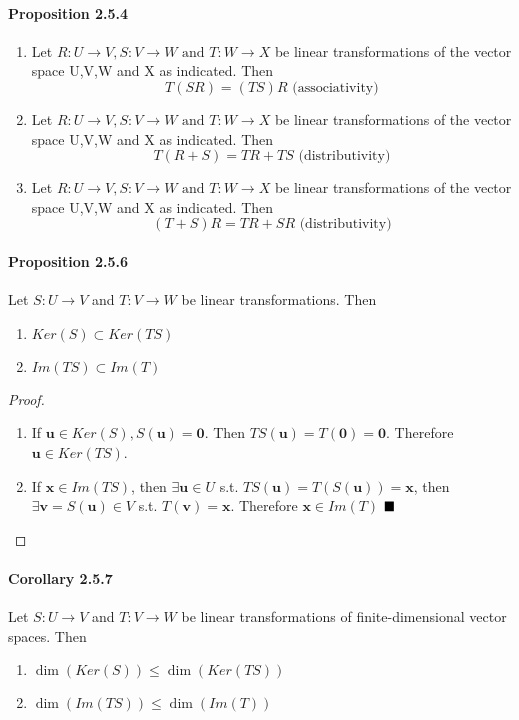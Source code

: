 \documentclass[11pt]{article}
\newcommand{\tb}[1]{\textbf{#1}}
\newcommand{\qed}[0]{$\hfill\blacksquare$}
\newcommand{\vx}[0]{\tb{x}}
\newcommand{\vo}[0]{\tb{0}}
\newcommand{\vu}[0]{\tb{u}}
\newcommand{\trans}[3]{{#1}: {#2} \rightarrow {#3}}
\begin{document}
{\paragraph{Proposition 2.5.4}
\begin{enumerate}
	\item Let $\trans{R}{U}{V}, \trans{S}{V}{W} \mbox{ and } \trans{T}{W}{X}$ be linear transformations of the vector space U,V,W and X as indicated. Then
	$$T(SR) = (TS)R \mbox{ (associativity)}$$
	\item Let $\trans{R}{U}{V}, \trans{S}{V}{W} \mbox{ and } \trans{T}{W}{X}$ be linear transformations of the vector space U,V,W and X as indicated. Then
	$$T(R+S) = TR + TS \mbox{ (distributivity)}$$
	\item Let $\trans{R}{U}{V}, \trans{S}{V}{W} \mbox{ and } \trans{T}{W}{X}$ be linear transformations of the vector space U,V,W and X as indicated. Then
	$$(T+S)R = TR + SR \mbox{ (distributivity)}$$
\end{enumerate}
\paragraph{Proposition 2.5.6} Let $\trans{S}{U}{V}$ and $\trans{T}{V}{W}$ be linear transformations. Then
\begin{enumerate}
	\item $Ker(S) \subset Ker(TS)$
	\item $Im(TS) \subset Im(T)$
\end{enumerate}
\begin{proof}
	\begin{enumerate}
		\item If $\vu \in Ker(S), S(\vu) = \vo$. Then $TS(\vu) = T(\vo) = \vo$. Therefore $\vu \in Ker(TS)$.
		\item If $\vx \in Im(TS)$, then $\exists \vu \in U$ s.t. $TS(\vu) = T(S(\vu))= \vx$, then $\exists \tb{v} = S(\vu) \in V$ s.t. $T(\tb{v}) = \vx$. Therefore $\vx \in Im(T)$ \qed
	\end{enumerate}
\end{proof}
\paragraph{Corollary 2.5.7} Let $\trans{S}{U}{V}$ and $\trans{T}{V}{W}$ be linear transformations of finite-dimensional vector spaces. Then
\begin{enumerate}
	\item $\dim(Ker(S)) \leq \dim(Ker(TS))$
	\item $\dim(Im(TS)) \leq \dim(Im(T))$
\end{enumerate}
}
\end{document}
